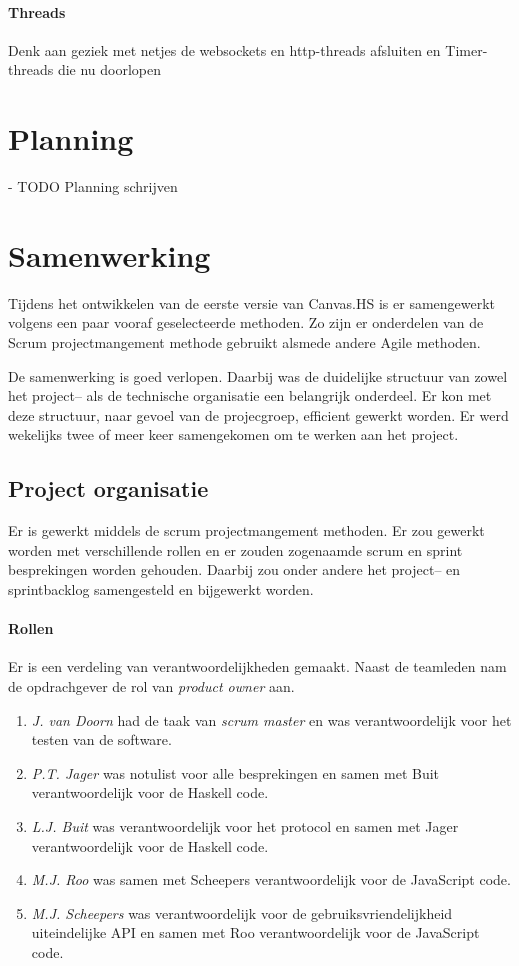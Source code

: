 \paragraph{Threads}
Denk aan geziek met netjes de websockets en http-threads afsluiten en Timer-threads die nu doorlopen

\section{Planning}
- TODO Planning schrijven
\section{Samenwerking}
Tijdens het ontwikkelen van de eerste versie van Canvas.HS is er samengewerkt volgens een paar vooraf geselecteerde methoden. Zo zijn er onderdelen van de Scrum projectmangement methode gebruikt alsmede andere Agile methoden.

De samenwerking is goed verlopen. Daarbij was de duidelijke structuur van zowel het project– als de technische organisatie een belangrijk onderdeel. Er kon met deze structuur, naar gevoel van de projecgroep, efficient gewerkt worden. Er werd wekelijks twee of meer keer samengekomen om te werken aan het project.

\subsection{Project organisatie}
Er is gewerkt middels de scrum projectmangement methoden. Er zou gewerkt worden met verschillende rollen en er zouden zogenaamde scrum en sprint besprekingen worden gehouden. Daarbij zou onder andere het project– en sprintbacklog samengesteld en bijgewerkt worden.

\paragraph{Rollen} Er is een verdeling van verantwoordelijkheden gemaakt. Naast de teamleden nam de opdrachgever de rol van \emph{product owner} aan.
\begin{enumerate}
    \item \emph{J. van Doorn} had de taak van \emph{scrum master} en was verantwoordelijk voor het testen van de software.
    \item \emph{P.T. Jager} was notulist voor alle besprekingen en samen met Buit verantwoordelijk voor de Haskell code.
    \item \emph{L.J. Buit} was verantwoordelijk voor het protocol en samen met Jager verantwoordelijk voor de Haskell code.
    \item \emph{M.J. Roo} was samen met Scheepers verantwoordelijk voor de JavaScript code.
    \item \emph{M.J. Scheepers} was verantwoordelijk voor de gebruiksvriendelijkheid uiteindelijke API en samen met Roo verantwoordelijk voor de JavaScript code.
\end{enumerate}

